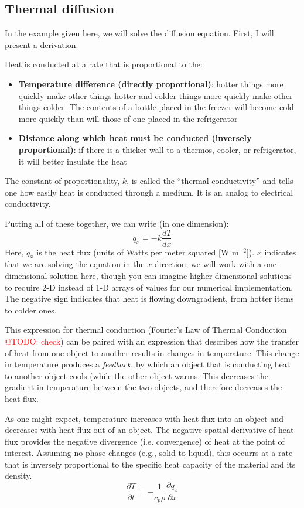 \documentclass[a4paper,10pt]{scrartcl}
\makeatletter
\newcommand{\todo}[1]{\textcolor{red}{@TODO: #1}}
\makeatother
\begin{document}
\subsection{Thermal diffusion}

In the example given here, we will solve the diffusion equation. First, I will present a derivation.

Heat is conducted at a rate that is proportional to the:
\begin{itemize}
 \item \textbf{Temperature difference (directly proportional)}: hotter things more quickly make other things hotter and colder things more quickly make other things colder. The contents of a bottle placed in the freezer will become cold more quickly than will those of one placed in the refrigerator
 \item \textbf{Distance along which heat must be conducted (inversely proportional)}: if there is a thicker wall to a thermos, cooler, or refrigerator, it will better insulate the heat
\end{itemize}
The constant of proportionality, $k$, is called the ``thermal conductivity'' and tells one how easily heat is conducted through a medium. It is an analog to electrical conductivity.

Putting all of these together, we can write (in one dimension):
\begin{equation}
 q_x = -k \frac{d T}{d x}
 \label{eq:FourierThermal}
\end{equation}
Here, $q_x$ is the heat flux (units of Watts per meter squared [W m$^{-2}$]). $x$ indicates that we are solving the equation in the $x$-direction; we will work with a one-dimensional solution here, though you can imagine higher-dimensional solutions to require 2-D instead of 1-D arrays of values for our numerical implementation. The negative sign indicates that heat is flowing downgradient, from hotter items to colder ones.

This expression for thermal conduction (Fourier's Law of Thermal Conduction \todo{check}) can be paired with an expression that describes how the transfer of heat from one object to another results in changes in temperature. This change in temperature produces a \textit{feedback}, by which an object that is conducting heat to another object cools (while the other object warms. This decreases the gradient in temperature between the two objects, and therefore decreases the heat flux.

As one might expect, temperature increases with heat flux into an object and decreases with heat flux out of an object. The negative spatial derivative of heat flux provides the negative divergence (i.e. convergence) of heat at the point of interest. Assuming no phase changes (e.g., solid to liquid), this occurrs at a rate that is inversely proportional to the specific heat capacity of the material and its density.
\begin{equation}
 \frac{\partial T}{\partial t} = -\frac{1}{c_p \rho} \frac{\partial q_x}{\partial x}
 \label{eq:conservation}
\end{equation}
\end{document}

